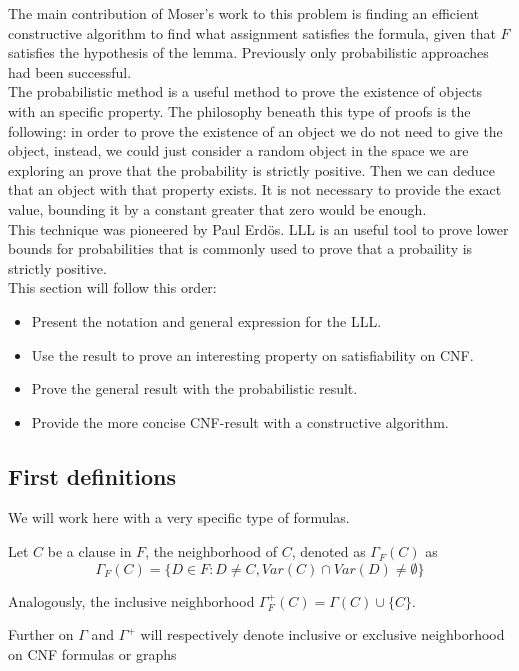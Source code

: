 The main contribution of Moser's work to this problem is finding an efficient constructive algorithm to find what assignment satisfies the formula, given that $F$ satisfies the hypothesis of the lemma. Previously only probabilistic approaches had been successful.\\


The probabilistic method is a useful method to prove the existence of objects with an specific property. The philosophy beneath this type of proofs is the following: in order to prove the existence of an object we do not need to give the object, instead, we could just consider a random object in the space we are exploring an prove that the probability is strictly positive. Then we can deduce that an object with that property exists. It is not necessary to provide the exact value, bounding it by a constant greater that zero would be enough. \\

This technique was pioneered by Paul Erdös. LLL is an useful tool to prove lower bounds for probabilities that is commonly used to prove that a probaility is strictly positive.\\

This section will follow this order:
\begin{itemize}
	\item Present the notation and general expression for the LLL.
	\item Use the result to prove an interesting property on satisfiability on CNF.
	\item Prove the general result with the probabilistic result.
	\item Provide the more concise CNF-result with a constructive algorithm.
\end{itemize}


\subsection{First definitions}

We will work here with a very specific type of formulas.
\begin{definition}
	Let $C$ be a clause in $F$, the neighborhood of $C$, denoted as $\Gamma_F(C)$ as 
	$$ \Gamma_F(C) = \{ D \in F : D\ne C, Var(C) \cap Var(D) \ne \emptyset\}$$
	
	Analogously, the inclusive neighborhood $\Gamma_F^+(C) = \Gamma(C) \cup \{C\}$. 
\end{definition}


Further on $\Gamma$ and $\Gamma^+$ will respectively denote inclusive or exclusive neighborhood on CNF formulas or graphs


